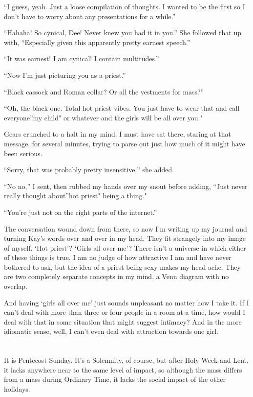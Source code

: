 ``I guess, yeah. Just a loose compilation of thoughts. I wanted to be the first so I don't have to worry about any presentations for a while.''

``Hahaha! So cynical, Dee! Never knew you had it in you.'' She followed that up with, ``Especially given this apparently pretty earnest speech.''

``It was earnest! I am cynical! I contain multitudes.''

``Now I'm just picturing you as a priest.''

``Black cassock and Roman collar? Or all the vestments for mass?''

``Oh, the black one. Total hot priest vibes. You just have to wear that and call everyone''my child" or whatever and the girls will be all over you."

Gears crunched to a halt in my mind. I must have sat there, staring at that message, for several minutes, trying to parse out just how much of it might have been serious.

``Sorry, that was probably pretty insensitive,'' she added.

``No no,'' I sent, then rubbed my hands over my snout before adding, ``Just never really thought about''hot priest" being a thing."

``You're just not on the right parts of the internet.''

The conversation wound down from there, so now I'm writing up my journal and turning Kay's words over and over in my head. They fit strangely into my image of myself. `Hot priest'? `Girls all over me'? There isn't a universe in which either of these things is true. I am no judge of how attractive I am and have never bothered to ask, but the idea of a priest being sexy makes my head ache. They are two completely separate concepts in my mind, a Venn diagram with no overlap.

And having `girls all over me' just sounds unpleasant no matter how I take it. If I can't deal with more than three or four people in a room at a time, how would I deal with that in some situation that might suggest intimacy? And in the more idiomatic sense, well, I can't even deal with attraction towards one girl.

\section{}

It is Pentecost Sunday. It's a Solemnity, of course, but after Holy Week and Lent, it lacks anywhere near to the same level of impact, so although the mass differs from a mass during Ordinary Time, it lacks the social impact of the other holidays.

